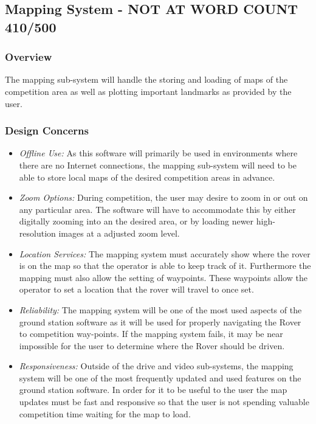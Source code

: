 \subsection{Mapping System - NOT AT WORD COUNT 410/500}
\subsubsection{Overview}
The mapping sub-system will handle the storing and loading of maps of the competition area as well as plotting important landmarks as provided by the user.

\subsubsection{Design Concerns}
\begin{itemize}
\item \textit{Offline Use:} As this software will primarily be used in environments where there are no Internet connections, the mapping sub-system will need to be able to store local maps of the desired competition areas in advance.
\item \textit{Zoom Options:} During competition, the user may desire to zoom in or out on any particular area. 
The software will have to accommodate this by either digitally zooming into an the desired area, or by loading newer high-resolution images at a adjusted zoom level.
\item \textit{Location Services:} The mapping system must accurately show where the rover is on the map so that the operator is able to keep track of it.
Furthermore the mapping must also allow the setting of waypoints.
These waypoints allow the operator to set a location that the rover will travel to once set.
\item \textit{Reliability:} The mapping system will be one of the most used aspects of the ground station software as it will be used for properly navigating the Rover to competition way-points. 
If the mapping system fails, it may be near impossible for the user to determine where the Rover should be driven.
\item \textit{Responsiveness:} Outside of the drive and video sub-systems, the mapping system will be one of the most frequently updated and used features on the ground station software.
In order for it to be useful to the user the map updates must be fast and responsive so that the user is not spending valuable competition time waiting for the map to load.
\end{itemize}

